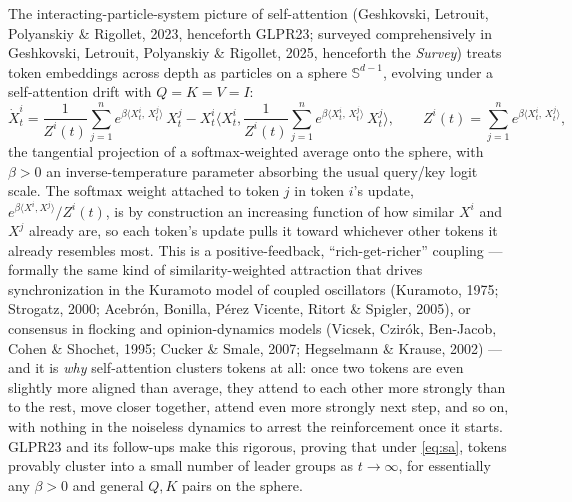 \documentclass[11pt]{article}
\begin{document}
The interacting-particle-system picture of self-attention (Geshkovski, Letrouit, Polyanskiy \& Rigollet, 2023, henceforth GLPR23; surveyed comprehensively in Geshkovski, Letrouit, Polyanskiy \& Rigollet, 2025, henceforth the \emph{Survey}) treats token embeddings across depth as particles on a sphere $\mathbb{S}^{d-1}$, evolving under a self-attention drift with $Q=K=V=I$:
\begin{equation}
    \dot X_t^i = \frac{1}{Z^i(t)} \sum_{j=1}^n e^{\beta \langle X_t^i,\, X_t^j\rangle}\, X_t^j - X_t^i\Big\langle X_t^i, \frac{1}{Z^i(t)} \sum_{j=1}^n e^{\beta \langle X_t^i,\, X_t^j\rangle}\, X_t^j\Big\rangle,
    \qquad Z^i(t) = \sum_{j=1}^n e^{\beta \langle X_t^i,\, X_t^j\rangle},
    \label{eq:sa}
\end{equation}
the tangential projection of a softmax-weighted average onto the sphere, with $\beta>0$ an inverse-temperature parameter absorbing the usual query/key logit scale. The softmax weight attached to token $j$ in token $i$'s update, $e^{\beta\langle X^i,X^j\rangle}/Z^i(t)$, is by construction an increasing function of how similar $X^i$ and $X^j$ already are, so each token's update pulls it toward whichever other tokens it already resembles most. This is a positive-feedback, ``rich-get-richer'' coupling --- formally the same kind of similarity-weighted attraction that drives synchronization in the Kuramoto model of coupled oscillators (Kuramoto, 1975; Strogatz, 2000; Acebrón, Bonilla, P\'erez Vicente, Ritort \& Spigler, 2005), or consensus in flocking and opinion-dynamics models (Vicsek, Czir\'ok, Ben-Jacob, Cohen \& Shochet, 1995; Cucker \& Smale, 2007; Hegselmann \& Krause, 2002) --- and it is \emph{why} self-attention clusters tokens at all: once two tokens are even slightly more aligned than average, they attend to each other more strongly than to the rest, move closer together, attend even more strongly next step, and so on, with nothing in the noiseless dynamics to arrest the reinforcement once it starts. GLPR23 and its follow-ups make this rigorous, proving that under \eqref{eq:sa}, tokens provably cluster into a small number of leader groups as $t\to\infty$, for essentially any $\beta>0$ and general $Q,K$ pairs on the sphere.
\end{document}
